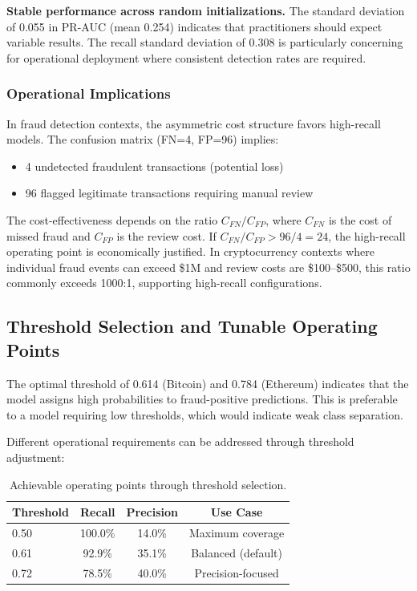 \documentclass[12pt,a4paper]{article}
\begin{document}
\textbf{Stable performance across random initializations.} The standard deviation of 0.055 in PR-AUC (mean 0.254) indicates that practitioners should expect variable results. The recall standard deviation of 0.308 is particularly concerning for operational deployment where consistent detection rates are required.

\subsubsection{Operational Implications}
In fraud detection contexts, the asymmetric cost structure favors high-recall models. The confusion matrix (FN=4, FP=96) implies:
\begin{itemize}
    \item 4 undetected fraudulent transactions (potential loss)
    \item 96 flagged legitimate transactions requiring manual review
\end{itemize}

The cost-effectiveness depends on the ratio $C_{FN}/C_{FP}$, where $C_{FN}$ is the cost of missed fraud and $C_{FP}$ is the review cost. If $C_{FN}/C_{FP} > 96/4 = 24$, the high-recall operating point is economically justified. In cryptocurrency contexts where individual fraud events can exceed \$1M and review costs are \$100--\$500, this ratio commonly exceeds 1000:1, supporting high-recall configurations.

\subsection{Threshold Selection and Tunable Operating Points}
The optimal threshold of 0.614 (Bitcoin) and 0.784 (Ethereum) indicates that the model assigns high probabilities to fraud-positive predictions. This is preferable to a model requiring low thresholds, which would indicate weak class separation.

Different operational requirements can be addressed through threshold adjustment:
\begin{table}[H]
\centering
\caption{Achievable operating points through threshold selection.}
\label{tab:modes}
\begin{tabular}{lccc}
\toprule
\textbf{Threshold} & \textbf{Recall} & \textbf{Precision} & \textbf{Use Case} \\
\midrule
0.50 & 100.0\% & 14.0\% & Maximum coverage \\
0.61 & 92.9\% & 35.1\% & Balanced (default) \\
0.72 & 78.5\% & 40.0\% & Precision-focused \\
\bottomrule
\end{tabular}
\end{table}
\end{document}
